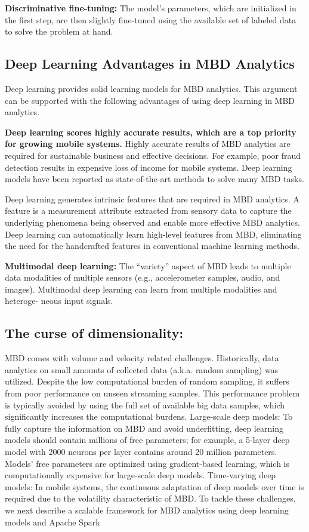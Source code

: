 \documentclass[14pt, a4paper]{extarticle}
\begin{document}
\textbf{Discriminative fine-tuning:} The model’s parameters, which
are initialized in the first step, are then slightly fine-tuned
using the available set of labeled data to solve the problem at
hand.

\subsection{Deep Learning Advantages in MBD Analytics}

Deep learning provides solid learning models for MBD analytics. This argument can be supported with the following advantages of using deep learning in MBD analytics.

\textbf{Deep learning scores highly accurate results, which are
a top priority for growing mobile systems.} Highly accurate
results of MBD analytics are required for sustainable business
and effective decisions. For example, poor fraud detection
results in expensive loss of income for mobile systems. Deep learning models have been reported as state-of-the-art methods to solve many MBD tasks.


Deep learning generates intrinsic features that are
required in MBD analytics. A feature is a measurement attribute extracted from sensory data to capture the underlying
phenomena being observed and enable more effective MBD
analytics. Deep learning can automatically learn high-level
features from MBD, eliminating the need for the handcrafted
features in conventional machine learning methods.

\textbf{Multimodal deep learning:} The “variety” aspect of MBD
leads to multiple data modalities of multiple sensors (e.g.,
accelerometer samples, audio, and images). Multimodal deep
learning can learn from multiple modalities and heteroge-
neous input signals.

\subsection{The curse of dimensionality:}

MBD comes with volume and
velocity related challenges. Historically, data analytics on small
amounts of collected data (a.k.a. random sampling) was utilized. Despite the low computational burden of random sampling, it suffers from poor performance on unseen streaming samples. This performance problem is typically avoided by
using the full set of available big data samples, which significantly increases the computational burdens.
Large-scale deep models: To fully capture the information
on MBD and avoid underfitting, deep learning models should
contain millions of free parameters; for example, a 5-layer
deep model with 2000 neurons per layer contains around 20
million parameters. Models’ free parameters are optimized
using gradient-based learning, which is computationally
expensive for large-scale deep models.
Time-varying deep models: In mobile systems, the continuous adaptation of deep models over time is required due to
the volatility characteristic of MBD.
To tackle these challenges, we next describe a scalable framework for MBD analytics using deep learning models and
Apache Spark
\end{document}
